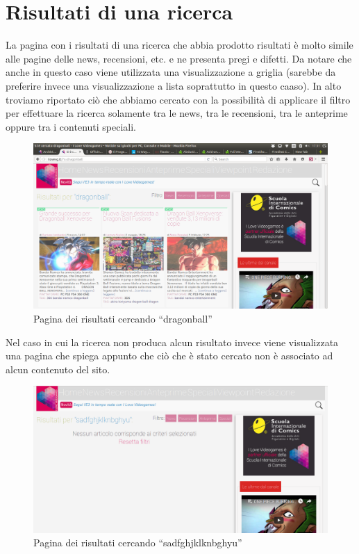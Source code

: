 \documentclass[../ProgettoTecWeb2.tex]{subfiles}
\begin{document}
\section{Risultati di una ricerca}
	La pagina con i risultati di una ricerca che abbia prodotto risultati è molto simile alle pagine delle news, recensioni, etc. e ne presenta pregi e difetti. Da notare che anche in questo caso viene utilizzata una visualizzazione a griglia (sarebbe da preferire invece una visualizzazione a lista soprattutto in questo caaso). In alto troviamo riportato ciò che abbiamo cercato con la possibilità di applicare il filtro per effettuare la ricerca solamente tra le news, tra le recensioni, tra le anteprime oppure tra i contenuti speciali.
	\begin{figure} [H]
		\centering
		\includegraphics[scale=0.2]{img/RicercaConRisultati}
		\caption{Pagina dei risultati cercando ``dragonball''}
	\end{figure}

	Nel caso in cui la ricerca non produca alcun risultato invece viene visualizzata una pagina che spiega appunto che ciò che è stato cercato non è associato ad alcun contenuto del sito.
	\begin{figure} [H]
		\centering
		\includegraphics[scale=0.2]{img/RicercaNoRisultati}
		\caption{Pagina dei risultati cercando ``sadfghjklknbghyu''}
	\end{figure}
\end{document}
